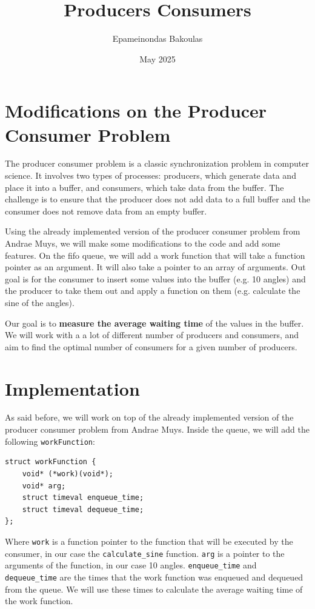 \documentclass{article}
\title{Producers Consumers}
\author{Epameinondas Bakoulas}
\date{May 2025}
\begin{document}
\maketitle

\section{Modifications on the Producer Consumer Problem}

The producer consumer problem is a classic synchronization problem in computer science. 
It involves two types of processes: producers, which generate data and place it into a buffer, 
and consumers, which take data from the buffer. The challenge is to ensure that the producer 
does not add data to a full buffer and the consumer does not remove data from an empty buffer.

Using the already implemented version of the producer consumer problem from Andrae Muys, we
will make some modifications to the code and add some features. On the fifo queue, we will add a
work function that will take a function pointer as an argument. It will also take a pointer to an
array of arguments. Out goal is for the consumer to insert some values into the buffer (e.g. 10 angles)
and the producer to take them out and apply a function on them (e.g. calculate the sine of the angles).

Our goal is to \textbf{measure the average waiting time} of the values in the buffer. We will work with a
a lot of different number of producers and consumers, and aim to find the optimal number of
consumers for a given number of producers.

\section{Implementation}

As said before, we will work on top of the already implemented version of the producer consumer problem 
from Andrae Muys. Inside the queue, we will add the following \texttt{workFunction}:

\begin{verbatim}
struct workFunction {
    void* (*work)(void*);
    void* arg;
    struct timeval enqueue_time;
    struct timeval dequeue_time;
};
\end{verbatim}

Where \texttt{work} is a function pointer to the function that will be executed by the consumer,
in our case the \texttt{calculate\_sine} function. \texttt{arg} is a pointer to the arguments of the function,
in our case 10 angles. \texttt{enqueue\_time} and \texttt{dequeue\_time} are the times that the work function was
enqueued and dequeued from the queue. We will use these times to calculate the average waiting time of the work function.
\end{document}
